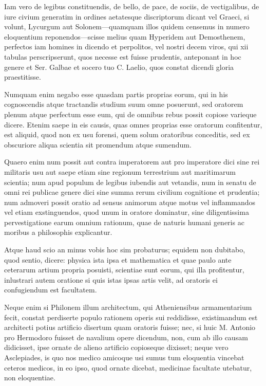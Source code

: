  Iam vero de legibus constituendis, de bello, de pace, de sociis, de vectigalibus, de iure civium generatim in ordines aetatesque discriptorum dicant vel Graeci, si volunt, Lycurgum aut Solonem—quamquam illos quidem censemus in numero eloquentium reponendos—scisse melius quam Hyperidem aut Demosthenem, perfectos iam homines in dicendo et perpolitos, vel nostri decem viros, qui xii tabulas perscripserunt, quos necesse est fuisse prudentis, anteponant in hoc genere et Ser. Galbae et socero tuo C. Laelio, quos constat dicendi gloria praestitisse.

 Numquam enim negabo esse quasdam partis proprias eorum, qui in his cognoscendis atque tractandis studium suum omne posuerunt, sed oratorem plenum atque perfectum esse eum, qui de omnibus rebus possit copiose varieque dicere. Etenim saepe in eis causis, quas omnes proprias esse oratorum confitentur, est aliquid, quod non ex usu forensi, quem solum oratoribus conceditis, sed ex obscuriore aliqua scientia sit promendum atque sumendum.

 Quaero enim num possit aut contra imperatorem aut pro imperatore dici sine rei militaris usu aut saepe etiam sine regionum terrestrium aut maritimarum scientia; num apud populum de legibus iubendis aut vetandis, num in senatu de omni rei publicae genere dici sine summa rerum civilium cognitione et prudentia; num admoveri possit oratio ad sensus animorum atque motus vel inflammandos vel etiam exstinguendos, quod unum in oratore dominatur, sine diligentissima pervestigatione earum omnium rationum, quae de naturis humani generis ac moribus a philosophis explicantur.

 Atque haud scio an minus vobis hoc sim probaturus; equidem non dubitabo, quod sentio, dicere: physica ista ipsa et mathematica et quae paulo ante ceterarum artium propria posuisti, scientiae sunt eorum, qui illa profitentur, inlustrari autem oratione si quis istas ipsas artis velit, ad oratoris ei confugiendum est facultatem.

 Neque enim si Philonem illum architectum, qui Atheniensibus armamentarium fecit, constat perdiserte populo rationem operis sui reddidisse, existimandum est architecti potius artificio disertum quam oratoris fuisse; nec, si huic M. Antonio pro Hermodoro fuisset de navalium opere dicendum, non, cum ab illo causam didicisset, ipse ornate de alieno artificio copioseque dixisset; neque vero Asclepiades, is quo nos medico amicoque usi sumus tum eloquentia vincebat ceteros medicos, in eo ipso, quod ornate dicebat, medicinae facultate utebatur, non eloquentiae.

